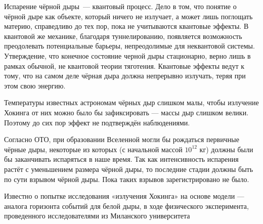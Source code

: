 \documentclass[a4paper, 12pt]{extarticle}
\begin{document}
  Испарение чёрной дыры~--- квантовый процесс. Дело в том, что понятие о чёрной дыре как объекте,
  который ничего не излучает, а может лишь поглощать материю, справедливо до тех пор, пока не
  учитываются квантовые эффекты. В квантовой же механике, благодаря туннелированию, появляется
  возможность преодолевать потенциальные барьеры, непреодолимые для неквантовой системы.
  Утверждение, что конечное состояние черной дыры стационарно, верно лишь в рамках обычной, не
  квантовой теории тяготения. Квантовые эффекты ведут к тому, что на самом деле чёрная дыра должна
  непрерывно излучать, теряя при этом свою энергию.

  Температуры известных астрономам чёрных дыр слишком малы,
  чтобы излучение Хокинга от них можно было бы зафиксировать — массы дыр слишком велики. Поэтому до
  сих пор эффект не подтверждён наблюдениями.

  Согласно ОТО, при образовании Вселенной могли бы рождаться первичные чёрные дыры, некоторые из
  которых (с начальной массой $10^{12}$ кг) должны были бы заканчивать испаряться в наше время. Так как
  интенсивность испарения растёт с уменьшением размера чёрной дыры, то последние стадии должны быть
  по сути взрывом чёрной дыры. Пока таких взрывов зарегистрировано не было.

  Известно о попытке исследования «излучения Хокинга» на основе модели — аналога горизонта событий
  для белой дыры, в ходе физического эксперимента, проведенного исследователями из Миланского
  университета
\end{document}
